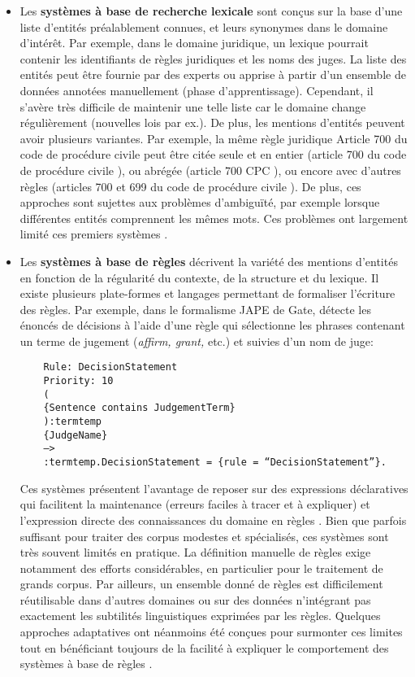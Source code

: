\begin{itemize}
\item Les \textbf{systèmes à base de recherche lexicale} sont conçus sur la base d'une liste d'entités préalablement connues, et leurs synonymes dans le domaine d'intérêt. Par exemple, dans le domaine juridique, un lexique pourrait contenir les identifiants de règles juridiques et les noms des juges. La liste des entités peut être fournie par des experts ou apprise à partir d'un ensemble de données annotées manuellement (phase d'apprentissage). Cependant, il s'avère très difficile de maintenir une telle liste car le domaine change régulièrement (nouvelles lois par ex.). De plus, les mentions d'entités peuvent avoir plusieurs variantes. Par exemple, la même règle juridique \og Article 700 du code de procédure civile \fg{} peut être citée seule et en entier (\og article 700 du code de procédure civile \fg{}), ou abrégée (\og article 700 CPC \fg{}), ou encore avec d'autres règles (\og articles 700 et 699 du code de procédure civile \fg{}). De plus, ces approches sont sujettes aux problèmes d'ambiguïté, par exemple lorsque différentes entités comprennent les mêmes mots. Ces problèmes ont largement limité ces premiers systèmes \citep{palmer1997learnedLookup}.

\item Les \textbf{systèmes à base de règles} décrivent la variété des mentions d'entités en fonction de la régularité du contexte, de la structure et du lexique. Il existe plusieurs plate-formes et langages permettant de formaliser l'écriture des règles. Par exemple, dans le formalisme JAPE de Gate, \citet{wyner2010extractlegalelts} détecte les énoncés de décisions à l'aide d'une règle qui sélectionne les phrases contenant un terme de jugement (\textit{affirm, grant,} etc.) et suivies d'un nom de juge:

\begin{verbatim}
	Rule: DecisionStatement
	Priority: 10
	(
	{Sentence contains JudgementTerm}
	):termtemp
	{JudgeName}
	–>
	:termtemp.DecisionStatement = {rule = “DecisionStatement”}.
\end{verbatim}

 Ces systèmes présentent l'avantage de reposer sur des expressions déclaratives qui facilitent la maintenance (erreurs faciles à tracer et à expliquer) et l'expression directe des connaissances du domaine en règles \citep{waltl2018ruleiesurvey}. Bien que parfois suffisant pour traiter des corpus modestes et spécialisés, ces systèmes sont très souvent limités en pratique. La définition manuelle de règles exige notamment des efforts considérables, en particulier pour le traitement de grands corpus. Par ailleurs, un ensemble donné de règles est difficilement réutilisable dans d'autres domaines ou sur des données n'intégrant pas exactement les subtilités linguistiques exprimées par les règles. Quelques approches adaptatives ont néanmoins été conçues pour surmonter ces limites tout en bénéficiant toujours de la facilité à expliquer le comportement des systèmes à base de règles \citep{siniakov2008gropusrulebased,chiticariu2010adaptativerulebased}.


\end{itemize}
